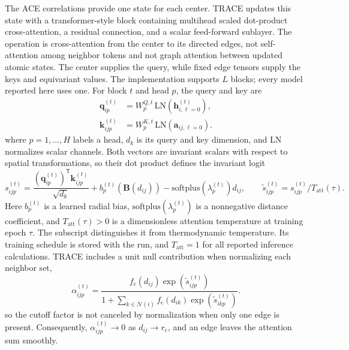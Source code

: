 \documentclass[aps,prx,preprint,notitlepage,superscriptaddress,nofootinbib,floatfix]{revtex4-2}
\newcommand{\calN}{\mathcal{N}}
\newcommand{\vect}[1]{\bm{#1}}
\begin{document}
The ACE correlations provide one state for each center.
TRACE updates this state with a transformer-style block containing multihead
scaled dot-product cross-attention, a residual connection, and a scalar
feed-forward sublayer. The operation is cross-attention from the center to its
directed edges, not self-attention among neighbor tokens and not graph
attention between updated atomic states. The center supplies the query, while
fixed edge tensors supply the keys and equivariant values. The implementation
supports $L$ blocks; every model reported here uses one. For block $t$ and head
$p$, the query and key are
\begin{align}
 \vect q^{(t)}_{ip} &= W^{Q,t}_p\,\mathrm{LN}\!\left(\vect h^{(t)}_{i,\ell=0}\right),\\
 \vect k^{(t)}_{ijp} &= W^{K,t}_p\,\mathrm{LN}\!\left(\vect a_{ij,\ell=0}\right).
 \label{eq:qk}
\end{align}
where $p=1,\ldots,H$ labels a head, $d_k$ is its query and
key dimension, and $\mathrm{LN}$ normalizes scalar channels. Both vectors are
invariant scalars with respect to spatial transformations, so their dot product
defines the invariant logit
\begin{equation}
 s^{(t)}_{ijp}=
 \frac{(\vect q^{(t)}_{ip})^{\mathsf T}\vect k^{(t)}_{ijp}}{\sqrt{d_k}}
 +b^{(t)}_p(\vect B(d_{ij}))
 -\mathrm{softplus}(\lambda^{(t)}_p)d_{ij},
 \qquad \widetilde s^{(t)}_{ijp}=s^{(t)}_{ijp}/T_{\mathrm{att}}(\tau).
 \label{eq:logit}
\end{equation}
Here $b^{(t)}_p$ is a learned radial bias,
$\mathrm{softplus}(\lambda^{(t)}_p)$ is a nonnegative distance coefficient, and
$T_{\mathrm{att}}(\tau)>0$ is a dimensionless attention temperature at training
epoch $\tau$. The subscript distinguishes it from thermodynamic temperature.
Its training schedule is stored with the run, and
$T_{\mathrm{att}}=1$ for all reported inference calculations. TRACE includes a
unit null contribution when normalizing each neighbor set,
\begin{equation}
 \alpha^{(t)}_{ijp}=
 \frac{f_{\mathrm c}(d_{ij})\exp(\widetilde s^{(t)}_{ijp})}
 {1+\sum_{k\in\calN(i)}f_{\mathrm c}(d_{ik})
 \exp(\widetilde s^{(t)}_{ikp})}.
 \label{eq:cutoff-attention}
\end{equation}
so the cutoff factor is not canceled by normalization when only one edge is present. Consequently,
$\alpha^{(t)}_{ijp}\rightarrow0$ as $d_{ij}\rightarrow r_{\mathrm c}$, and an
edge leaves the attention sum smoothly.
\end{document}
